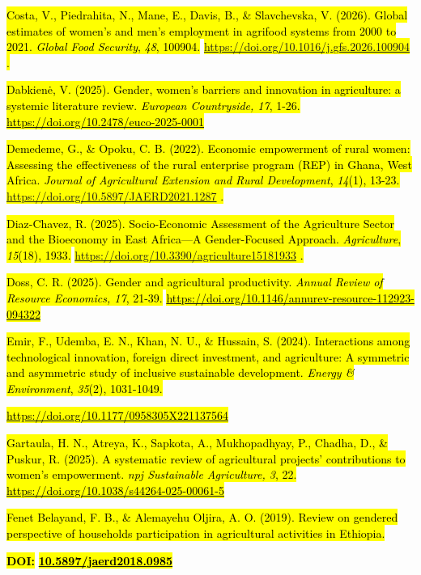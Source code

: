 \hl{Costa, V., Piedrahita, N., Mane, E., Davis, B., \& Slavchevska, V.
(2026). Global estimates of women's and men's employment in agrifood
systems from 2000 to 2021. \emph{Global Food Security}, \emph{48},
100904.} \hl{\mbox{\url{https://doi.org/10.1016/j.gfs.2026.100904}} .}

\hl{Dabkienė, V. (2025). Gender, women's barriers and innovation in
agriculture: a systemic literature review. \emph{European Countryside,
17}, 1-26.}
\href{https://doi.org/10.2478/euco-2025-0001}{\hl{https://doi.org/10.2478/euco-2025-0001}}

\hl{Demedeme, G., \& Opoku, C. B. (2022). Economic empowerment of rural
women: Assessing the effectiveness of the rural enterprise program (REP)
in Ghana, West Africa. \emph{Journal of Agricultural Extension and Rural
Development}, \emph{14}(1), 13-23.}
\hl{\mbox{\url{https://doi.org/10.5897/JAERD2021.1287}} .}

\hl{Diaz-Chavez, R. (2025). Socio-Economic Assessment of the Agriculture
Sector and the Bioeconomy in East Africa---A Gender-Focused Approach.
\emph{Agriculture}, \emph{15}(18), 1933.}
\hl{\mbox{\url{https://doi.org/10.3390/agriculture15181933}} .}

\hl{Doss, C. R. (2025). Gender and agricultural productivity.
\emph{Annual Review of Resource Economics, 17}, 21-39.}
\href{https://doi.org/10.1146/annurev-resource-112923-094322}{\hl{https://doi.org/10.1146/annurev-resource-112923-094322}}

\hl{Emir, F., Udemba, E. N., Khan, N. U., \& Hussain, S. (2024).
Interactions among technological innovation, foreign direct investment,
and agriculture: A symmetric and asymmetric study of inclusive
sustainable development. \emph{Energy \& Environment}, \emph{35}(2),
1031-1049.}

\href{https://doi.org/10.1177/0958305X221137564}{\hl{https://doi.org/10.1177/0958305X221137564}}

\hl{Gartaula, H. N., Atreya, K., Sapkota, A., Mukhopadhyay, P., Chadha,
D., \& Puskur, R. (2025). A systematic review of agricultural projects'
contributions to women's empowerment. \emph{npj Sustainable Agriculture,
3}, 22.}
\href{https://doi.org/10.1038/s44264-025-00061-5}{\hl{https://doi.org/10.1038/s44264-025-00061-5}}

\hl{Fenet Belayand, F. B., \& Alemayehu Oljira, A. O. (2019). Review on
gendered perspective of household\textquotesingle s participation in
agricultural activities in Ethiopia.}

\textbf{\hl{DOI:}}
\href{https://doi.org/10.5897/jaerd2018.0985}{\textbf{\hl{10.5897/jaerd2018.0985}}}

